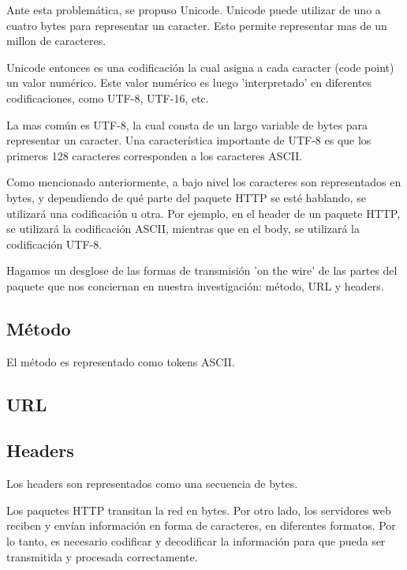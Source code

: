 \documentclass{prgrado}
\begin{document}
Ante esta problemática, se propuso Unicode. Unicode puede utilizar de uno a cuatro bytes para representar un caracter. Esto permite representar mas de un millon de caracteres.

Unicode entonces es una codificación la cual asigna a cada caracter (code point) un valor numérico. Este valor numérico es luego 'interpretado' en diferentes codificaciones, como UTF-8, UTF-16, etc.

La mas común es UTF-8, la cual consta de un largo variable de bytes para representar un caracter. Una característica importante de UTF-8 es que los primeros 128 caracteres corresponden a los caracteres ASCII.

Como mencionado anteriormente, a bajo nivel los caracteres son representados en bytes, y dependiendo de qué parte del paquete HTTP se esté hablando, se utilizará una codificación u otra. Por ejemplo, en el header de un paquete HTTP, se utilizará la codificación ASCII, mientras que en el body, se utilizará la codificación UTF-8.

Hagamos un desglose de las formas de transmisión 'on the wire' de las partes del paquete que nos conciernan en nuestra investigación: método, URL y headers.

\subsection{Método}

El método es representado como tokens ASCII.

\subsection{URL}


\subsection{Headers}

Los headers son representados como una secuencia de bytes.







Los paquetes HTTP transitan la red en bytes. Por otro lado, los servidores web reciben y envían información en forma de caracteres, en diferentes formatos. Por lo tanto, es necesario codificar y decodificar la información para que pueda ser transmitida y procesada correctamente.

\end{document}
